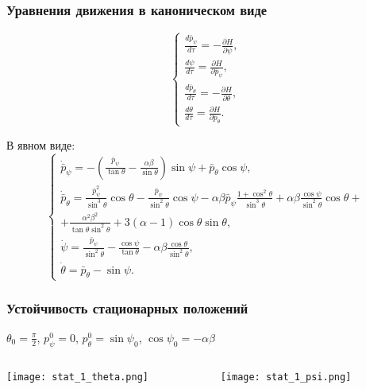 \documentclass[10pt,pdf,hyperref={unicode}]{beamer}
\begin{document}
\begin{frame}
\frametitle{Уравнения движения в каноническом виде}
	\begin{equation*}
		\begin{cases}
			\frac{d\bar{p}_\psi}{d\tau} = - \frac{\partial H}{\partial \psi},\\
			\frac{d\psi}{d\tau} = \frac{\partial H}{\partial \bar{p}_\psi},\\
			\frac{d\bar{p}_\theta}{d\tau} = - \frac{\partial H}{\partial \theta},\\
			\frac{d\theta}{d\tau} = \frac{\partial H}{\partial \bar{p}_\theta}.
		\end{cases}
	\end{equation*}
	
	В явном виде:
	\begin{equation*}
		\begin{cases}
			\dot{\bar{p}}_\psi = - \left( \frac{\bar{p}_\psi}{\tan \theta} - \frac{\alpha\beta}{\sin \theta} \right) \sin \psi + \bar{p}_\theta \cos \psi, \\
			\dot{\bar{p}}_\theta = \frac{\bar{p}_\psi^2}{\sin^3 \theta} \cos \theta - \frac{ \bar{p}_\psi}{\sin^2 \theta} \cos \psi - \alpha \beta \bar{p}_\psi \frac{1 + \cos^2\theta}{\sin^3 \theta} + \alpha \beta \frac{\cos \psi}{\sin^2 \theta} \cos \theta + \\
			+ \frac{\alpha^2 \beta^2}{\tan \theta \sin^2 \theta} + 3 \left(\alpha -1\right) \cos \theta \sin \theta, \\
			\dot{\psi} = \frac{\bar{p}_\psi}{\sin^2 \theta} - \frac{\cos \psi}{\tan \theta} - \alpha\beta \frac{\cos\theta}{\sin^2 \theta}, \\
			\dot{\theta} = \bar{p}_\theta - \sin \psi.
		\end{cases}
	\end{equation*}
\end{frame}

\begin{frame}
\frametitle{Устойчивость стационарных положений}
	$\theta_0 = \frac{\pi}{2}$, $p_\psi^0 = 0$, $p_\theta^0 = \sin \psi_0$, $\cos \psi_0 = -\alpha\beta$
	
	\begin{columns}[onlytextwidth]
		\begin{column}{0.5\textwidth}
			\texttt{[image: stat\_1\_theta.png]}
		\end{column}
		\begin{column}{0.5\textwidth}
			\texttt{[image: stat\_1\_psi.png]}
		\end{column}
	\end{columns}
\end{frame}
\end{document}
